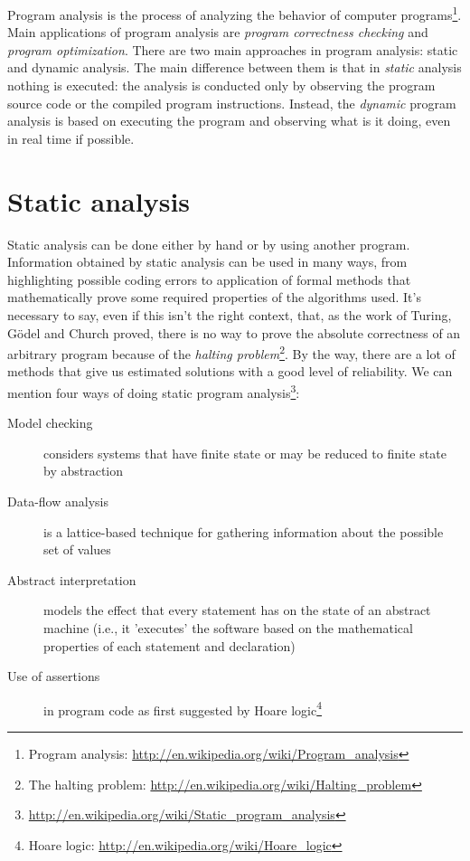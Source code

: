 \documentclass[a4paper,11pt]{report}
\begin{document}
Program analysis is the process of analyzing the behavior of computer
programs\footnote{Program analysis:
\url{http://en.wikipedia.org/wiki/Program_analysis}}. Main applications of
program analysis are \emph{program correctness checking} and \emph{program
optimization}.
There are two main approaches in program analysis: static and dynamic analysis.
The main difference between them is that in \emph{static} analysis nothing is
executed: the analysis is conducted only by observing the program source code or
the compiled program instructions. Instead, the \emph{dynamic} program analysis
is based on executing the program and observing what is it doing, even in real
time if possible.

\section{Static analysis}

Static analysis can be done either by hand or by using another program.
Information obtained by static analysis can be used in many ways, from
highlighting possible coding errors to application of formal methods that
mathematically prove some required properties of the algorithms used. It's
necessary to say, even if this isn't the right context, that, as the work of
Turing, G\"{o}del and Church proved, there is no way to prove the absolute
correctness of an arbitrary program because of the \emph{halting
problem}\footnote{The halting problem:
\url{http://en.wikipedia.org/wiki/Halting_problem}}.
By the way, there are a lot of methods that give us estimated solutions with a
good level of reliability. We can mention four ways of doing static program
analysis\footnote{\url{http://en.wikipedia.org/wiki/Static_program_analysis}}:


\begin{description}
\item[Model checking] considers systems that have finite state or may be reduced to finite state by abstraction
\item[Data-flow analysis] is a lattice-based technique for gathering information about the possible set of values
\item[Abstract interpretation] models the effect that every statement has on the
state of an abstract machine (i.e., it 'executes' the software based on the
mathematical properties of each statement and declaration)
\item[Use of assertions] in program code as first suggested by Hoare
logic\footnote{Hoare logic: \url{http://en.wikipedia.org/wiki/Hoare_logic}}
\end{description}
\end{document}
